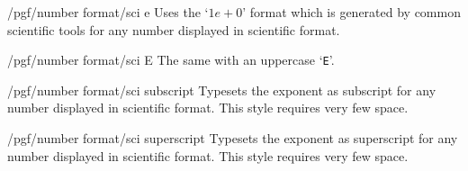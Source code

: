 \begin{key}{/pgf/number format/sci e}
Uses the `$1e{+}0$' format which is generated by common scientific tools for any number displayed in scientific format.

\begin{codeexample}[]
\end{codeexample}
\end{key}

\begin{key}{/pgf/number format/sci E}
The same with an uppercase `\texttt{E}'.

\begin{codeexample}[]
\end{codeexample}
\end{key}

\begin{key}{/pgf/number format/sci subscript}
Typesets the exponent as subscript for any number displayed in scientific format. This style requires very few space.

\begin{codeexample}[]
\end{codeexample}
\end{key}

\begin{key}{/pgf/number format/sci superscript}
Typesets the exponent as superscript for any number displayed in scientific format. This style requires very few space.

\begin{codeexample}[]
\end{codeexample}
\end{key}

